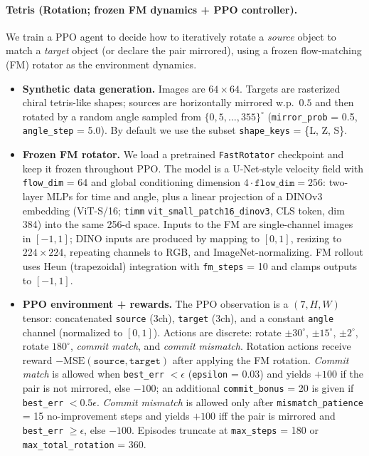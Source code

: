 \documentclass{l4proj}
\begin{document}
\paragraph{Tetris (Rotation; frozen FM dynamics + PPO controller).}
We train a PPO agent to decide how to iteratively rotate a \emph{source} object to match a \emph{target} object (or declare the pair mirrored), using a frozen flow-matching (FM) rotator as the environment dynamics.
\begin{itemize}
    \item \textbf{Synthetic data generation.} Images are $64{\times}64$. Targets are rasterized chiral tetris-like shapes; sources are horizontally mirrored w.p.\ $0.5$ and then rotated by a random angle sampled from $\{0, 5, \dots, 355\}^\circ$ (\texttt{mirror\_prob} = 0.5, \texttt{angle\_step} = 5.0). By default we use the subset \texttt{shape\_keys} = \{L, Z, S\}.
    \item \textbf{Frozen FM rotator.} We load a pretrained \texttt{FastRotator} checkpoint and keep it frozen throughout PPO. The model is a U-Net-style velocity field with \texttt{flow\_dim} = 64 and global conditioning dimension $4 \cdot \texttt{flow\_dim} = 256$: two-layer MLPs for time and angle, plus a linear projection of a DINOv3 embedding (ViT-S/16; \texttt{timm} \texttt{vit\_small\_patch16\_\allowbreak dinov3}, CLS token, dim 384) into the same 256-d space. Inputs to the FM are single-channel images in $[-1,1]$; DINO inputs are produced by mapping to $[0,1]$, resizing to $224{\times}224$, repeating channels to RGB, and ImageNet-normalizing. FM rollout uses Heun (trapezoidal) integration with \texttt{fm\_steps} = 10 and clamps outputs to $[-1,1]$.
    \item \textbf{PPO environment + rewards.} The PPO observation is a $(7,H,W)$ tensor: concatenated \texttt{source} (3ch), \texttt{target} (3ch), and a constant \texttt{angle} channel (normalized to $[0,1]$). Actions are discrete: rotate $\pm30^\circ$, $\pm15^\circ$, $\pm2^\circ$, rotate $180^\circ$, \emph{commit match}, and \emph{commit mismatch}. Rotation actions receive reward $-\mathrm{MSE}(\texttt{source}, \texttt{target})$ after applying the FM rotation. \emph{Commit match} is allowed when \texttt{best\_err} $< \epsilon$ (\texttt{epsilon} = 0.03) and yields $+100$ if the pair is not mirrored, else $-100$; an additional \texttt{commit\_bonus} = 20 is given if \texttt{best\_err} $< 0.5\epsilon$. \emph{Commit mismatch} is allowed only after \texttt{mismatch\_patience} = 15 no-improvement steps and yields $+100$ iff the pair is mirrored and \texttt{best\_err} $\ge \epsilon$, else $-100$. Episodes truncate at \texttt{max\_steps} = 180 or \texttt{max\_total\_rotation} = 360.

\end{itemize}
\end{document}
